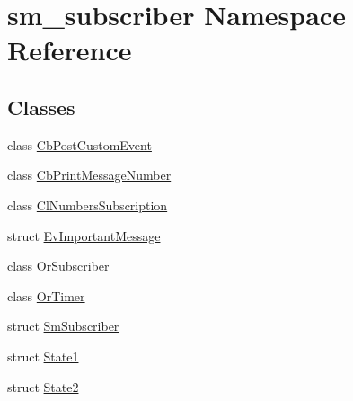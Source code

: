 \hypertarget{namespacesm__subscriber}{}\section{sm\+\_\+subscriber Namespace Reference}
\label{namespacesm__subscriber}
\subsection*{Classes}
\begin{DoxyCompactItemize}
\item 
class \hyperlink{classsm__subscriber_1_1CbPostCustomEvent}{Cb\+Post\+Custom\+Event}
\item 
class \hyperlink{classsm__subscriber_1_1CbPrintMessageNumber}{Cb\+Print\+Message\+Number}
\item 
class \hyperlink{classsm__subscriber_1_1ClNumbersSubscription}{Cl\+Numbers\+Subscription}
\item 
struct \hyperlink{structsm__subscriber_1_1EvImportantMessage}{Ev\+Important\+Message}
\item 
class \hyperlink{classsm__subscriber_1_1OrSubscriber}{Or\+Subscriber}
\item 
class \hyperlink{classsm__subscriber_1_1OrTimer}{Or\+Timer}
\item 
struct \hyperlink{structsm__subscriber_1_1SmSubscriber}{Sm\+Subscriber}
\item 
struct \hyperlink{structsm__subscriber_1_1State1}{State1}
\item 
struct \hyperlink{structsm__subscriber_1_1State2}{State2}
\end{DoxyCompactItemize}
